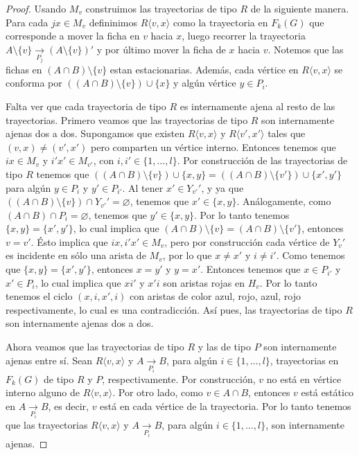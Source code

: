 \begin{proof}
    Usando $M_v$ construimos las trayectorias de tipo $R$ de la siguiente
    manera. Para cada $jx \in M_v$ defininimos $R\langle v, x \rangle$ como la
    trayectoria en $F_k(G)$ que corresponde a mover la ficha en $v$ hacia $x$,
    luego recorrer la trayectoria $A\setminus \{v\} \xrightarrow[P_j]{}
    (A\setminus \{v\})'$ y por \'ultimo mover la ficha de $x$ hacia $v$. Notemos
    que las fichas en $(A\cap B)\setminus \{v\}$ estan estacionarias. Adem\'as,
    cada v\'ertice en $R\langle v,x \rangle$ se conforma por $((A\cap
    B)\setminus \{v\}) \cup \{x\}$ y alg\'un v\'ertice $y \in P_i$.

    Falta ver que cada trayectoria de tipo $R$ es internamente ajena al resto de
    las trayectorias. Primero veamos que las trayectorias de tipo $R$ son
    internamente ajenas dos a dos. Supongamos que existen $R \langle v, x
    \rangle$ y $R\langle v',x' \rangle$ tales que $(v,x) \neq (v',x')$ pero
    comparten un v\'ertice interno. Entonces tenemos que $ix \in M_v$ y $i'x'\in
    M_{v'}$, con $i, i' \in \{1, \dots, l\}$. Por construcci\'on de las
    trayectorias de tipo $R$ tenemos que $((A\cap B)\setminus \{v\}) \cup \{x,
    y\} =((A\cap B)\setminus \{v'\}) \cup \{x', y'\}$ para alg\'un $y \in P_i$ y
    $y' \in P_{i'}$. Al tener $x'\in Y_{v'} '$, y ya que $((A \cap B )\setminus
    \{v\}) \cap Y_{v'}'= \varnothing$, tenemos que $x' \in \{x,y\}$.
    An\'alogamente, como $(A \cap B) \cap P_i = \varnothing$, tenemos que $y'\in
    \{x, y\}$. Por lo tanto tenemos $\{x,y\}= \{x',y'\}$, lo cual implica que
    $(A\cap B)\setminus \{v\} = (A\cap B)\setminus \{v'\}$, entonces $v = v'$.
    \'Esto implica que $ix, i'x' \in M_v$, pero por construcci\'on cada
    v\'ertice de $Y_v '$ es incidente en s\'olo una arista de $M_v$, por lo que
    $x \neq x'$ y $i \neq i'$. Como tenemos que $\{x, y\}=\{x', y'\}$, entonces
    $x=y'$ y $y=x'$. Entonces tenemos que $x \in P_{i'}$ y $x'\in P_i$, lo cual
    implica que $xi'$ y $x'i$ son aristas rojas en $H_v$. Por lo tanto tenemos
    el ciclo $(x, i, x', i)$ con aristas de color azul, rojo, azul, rojo
    respectivamente, lo cual es una contradicci\'on. As\'i pues, las
    trayectorias de tipo $R$ son internamente ajenas dos a dos.

    Ahora veamos que las trayectorias de tipo $R$ y las de tipo $P$ son
    internamente ajenas entre s\'i. Sean $R\langle v,x \rangle$ y $A
    \xrightarrow[P_i]{}  B$, para alg\'un $i \in \{1, \dots, l\}$, trayectorias
    en $F_k(G)$ de tipo $R$ y $P$, respectivamente. Por construcci\'on, $v$ no
    est\'a en v\'ertice interno alguno de $R \langle v,x \rangle$. Por otro
    lado, como $ v \in A\cap B$, entonces $v$ est\'a est\'atico en $A
    \xrightarrow[P_i]{}  B$, es decir, $v$ est\'a en cada v\'ertice de la
    trayectoria. Por lo tanto tenemos que las trayectorias $R\langle v,x
    \rangle$ y $A \xrightarrow[P_i]{}  B$, para alg\'un $i \in \{1, \dots, l\}$,
    son internamente ajenas.


\end{proof}
